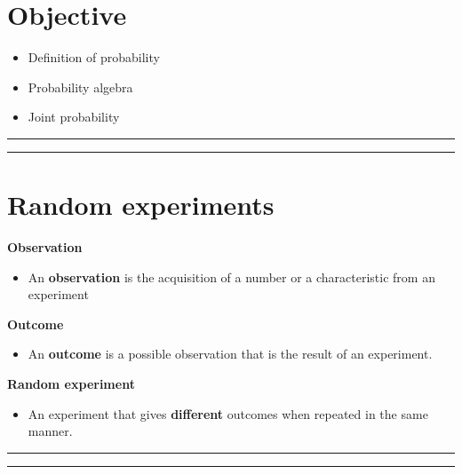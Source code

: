 \documentclass[
]{book}
\providecommand{\tightlist}{%
  \setlength{\itemsep}{0pt}\setlength{\parskip}{0pt}}
\begin{document}
\hypertarget{objective-1}{%
\section{Objective}\label{objective-1}}

\begin{itemize}
\tightlist
\item
  Definition of probability
\item
  Probability algebra
\item
  Joint probability
\end{itemize}

\begin{center}\rule{0.5\linewidth}{0.5pt}\end{center}

\begin{center}\rule{0.5\linewidth}{0.5pt}\end{center}

\hypertarget{random-experiments-1}{%
\section{Random experiments}\label{random-experiments-1}}

\textbf{Observation}

\begin{itemize}
\tightlist
\item
  An \textbf{observation} is the acquisition of a number or a characteristic from an experiment
\end{itemize}

\textbf{Outcome}

\begin{itemize}
\tightlist
\item
  An \textbf{outcome} is a possible observation that is the result of an experiment.
\end{itemize}

\textbf{Random experiment}

\begin{itemize}
\tightlist
\item
  An experiment that gives \textbf{different} outcomes when repeated in the same manner.
\end{itemize}

\begin{center}\rule{0.5\linewidth}{0.5pt}\end{center}

\begin{center}\rule{0.5\linewidth}{0.5pt}\end{center}
\end{document}
